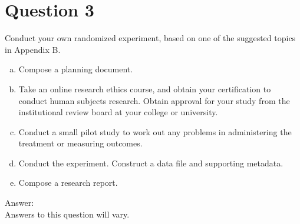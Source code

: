 \documentclass[11pt,notitlepage]{article}\usepackage[]{graphicx}\usepackage[]{color}
\begin{document}
\section*{Question 3}
Conduct your own randomized experiment, based on one of the suggested topics in Appendix B.
\begin{enumerate}[a)]
\item Compose a planning document.
\item Take an online research ethics course, and obtain your certification to conduct human subjects research. Obtain approval for your study from the institutional review board at your college or university.
\item Conduct a small pilot study to work out any problems in administering the treatment or measuring outcomes.
\item Conduct the experiment. Construct a data file and supporting metadata.
\item Compose a research report.
\end{enumerate}
Answer:\\
Answers to this question will vary.
\end{document}
